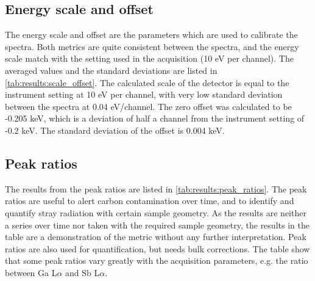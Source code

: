 


\subsection*{Energy scale and offset}
\label{results:setup:scale_offset}

The energy scale and offset are the parameters which are used to calibrate the spectra.
Both metrics are quite consistent between the spectra, and the energy scale match with the setting used in the acquisition (10 eV per channel).
The averaged values and the standard deviations are listed in \cref{tab:results:scale_offset}.
The calculated scale of the detector is equal to the instrument setting at 10 eV per channel, with very low standard deviation between the spectra at 0.04 eV/channel.
The zero offset was calculated to be -0.205 keV, which is a deviation of half a channel from the instrument setting of -0.2 keV.
The standard deviation of the offset is 0.004 keV.






\subsection*{Peak ratios}
\label{results:setup:peak_ratios}

The results from the peak ratios are listed in \cref{tab:results:peak_ratios}.
The peak ratios are useful to alert carbon contamination over time, and to identify and quantify stray radiation with certain sample geometry.
As the results are neither a series over time nor taken with the required sample geometry, the results in the table are a demonstration of the metric without any further interpretation.
Peak ratios are also used for quantification, but needs bulk corrections.
The table show that some peak ratios vary greatly with the acquisition parameters, e.g. the ratio between Ga L$\alpha$ and Sb L$\alpha$.






